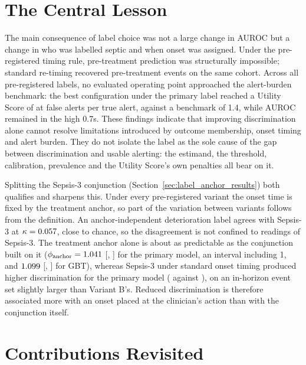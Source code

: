 \section{The Central Lesson}

The main consequence of label choice was not a large change in AUROC but a
change in who was labelled septic and when onset was assigned. Under the
pre-registered timing rule, pre-treatment prediction was structurally
impossible; standard re-timing recovered pre-treatment events on the same
cohort. Across all pre-registered labels, no evaluated operating point
approached the alert-burden benchmark: the best configuration under the
primary label reached a Utility Score of \pcUtilityMaxGbtB{} at
\pcUtilityOptBurdenGbtB{} false alerts per true alert, against a benchmark of
1.4, while AUROC remained in the high 0.7s. These findings indicate that
improving discrimination alone cannot resolve limitations introduced by outcome
membership, onset timing and alert burden. They do not isolate the label as the
sole cause of the gap between discrimination and usable alerting: the
estimand, the threshold, calibration, prevalence and the Utility Score's own
penalties all bear on it.

Splitting the Sepsis-3 conjunction (Section~\ref{sec:label_anchor_results})
both qualifies and sharpens this. Under every pre-registered variant the onset
time is fixed by the treatment anchor, so part of the variation between
variants follows from the definition. An anchor-independent deterioration
label agrees with Sepsis-3 at $\kappa = 0.057$, close to chance, so the
disagreement is not confined to readings of Sepsis-3. The treatment anchor
alone is about as predictable as the conjunction built on it
($\phi_{\text{anchor}} = 1.041$
[\pcPhiAnchorCiLoPrimary, \pcPhiAnchorCiHiPrimary] for the primary model, an
interval including 1, and $1.099$
[\pcPhiAnchorCiLoGbt, \pcPhiAnchorCiHiGbt] for GBT), whereas Sepsis-3 under
standard onset timing produced higher discrimination for the primary model
(\pcAltAurocFullPrimaryF{} against \pcAurocPrimaryB), on an in-horizon event
set slightly larger than Variant B's. Reduced discrimination is therefore
associated more with an onset placed at the clinician's action than with the
conjunction itself.


\section{Contributions Revisited}

